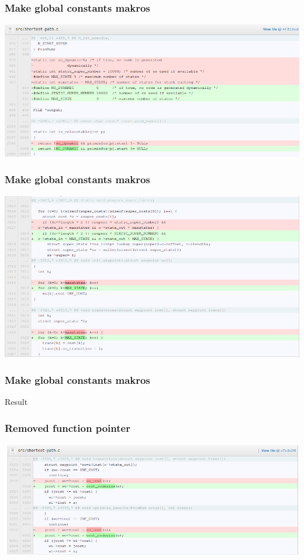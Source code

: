 \documentclass{beamer}
\begin{document}
\begin{frame}\frametitle{Make global constants makros}
\begin{center}
\includegraphics[scale=0.4]{shots/mgcm1.png}
\end{center}
\end{frame}

\begin{frame}\frametitle{Make global constants makros}
\begin{center}
\includegraphics[scale=0.4]{shots/mgcm2.png}
\end{center}
\end{frame}

\begin{frame}\frametitle{Make global constants makros}
\begin{center}
Result
\end{center}
\end{frame}

\begin{frame}\frametitle{Removed function pointer}
\begin{center}
\includegraphics[scale=0.4]{shots/fp.png}
\end{center}
\end{frame}
\end{document}
